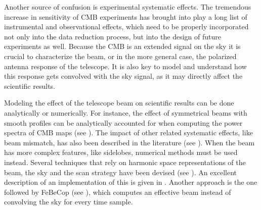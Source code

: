 \documentclass[a4paper,11pt]{article}
\begin{document}
Another source of confusion is experimental systematic effects. The tremendous increase in sensitivity of CMB experiments has brought into play a long list of instrumental and observational effects, which need to be properly incorporated not only into the data reduction process, but into the design of future experiments as well. Because the CMB is an extended signal on the sky it is crucial to characterize the beam, or in the more general case, the polarized antenna response of the telescope. It is also key to model and understand how this response gets convolved with the sky signal, as it may directly affect the scientific results.

Modeling the effect of the telescope beam on scientific results can be done analytically or numerically. For instance, the effect of symmetrical beams with smooth profiles can be analytically accounted for when computing the power spectra of CMB maps (see \cite{2003ApJS..148...39P}). The impact of other related systematic effects, like beam mismatch, has also been described in the literature (see \cite{PhysRevD.77.083003, 2007MNRAS.376.1767O, 2015JCAP...03..048D}). When the beam has more complex features, like sidelobes, numerical methods must be used instead. Several techniques that rely on harmonic space representations of the beam, the sky and the scan strategy have been devised (see \cite{2001PhRvD..63l3002W,2000PhRvD..62l3002C}). An excellent description of an implementation of this is given in \cite{2018arXiv180905034D}. Another approach is the one followed by FeBeCop (see \cite{2011ApJS..193....5M}), which computes an effective beam instead of convolving the sky for every time sample. 

\end{document}
